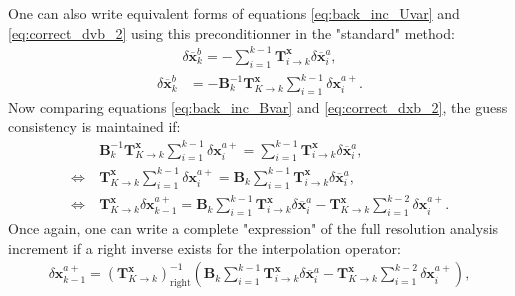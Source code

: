 \documentclass[npg, manuscript]{copernicus}
\begin{document}
One can also write equivalent forms of equations \eqref{eq:back_inc_Uvar} and \eqref{eq:correct_dvb_2} using this preconditionner in the "standard" method:
\begin{align}
\label{eq:back_inc_Bvar}
\delta \overline{\mathbf{x}}^b_k = - \sum_{i=1}^{k-1} \mathbf{T}^\mathbf{x}_{i \rightarrow k} \delta \overline{\mathbf{x}}^a_i,
\end{align}
\begin{align}
\label{eq:correct_dxb_2}
\delta \overline{\mathbf{x}}^b_k & = -\mathbf{B}^{-1}_k \mathbf{T}^\mathbf{x}_{K \rightarrow k} \sum_{i=1}^{k-1} \delta \mathbf{x}^{a+}_i.
\end{align}
Now comparing equations \eqref{eq:back_inc_Bvar} and \eqref{eq:correct_dxb_2}, the guess consistency is maintained if:
\begin{align}
\label{eq:general_condition_B}
& \mathbf{B}^{-1}_k \mathbf{T}^\mathbf{x}_{K \rightarrow k} \sum_{i=1}^{k-1} \delta \mathbf{x}^{a+}_i = \sum_{i=1}^{k-1} \mathbf{T}^\mathbf{x}_{i \rightarrow k} \delta \overline{\mathbf{x}}^a_i, \nonumber \\
\Leftrightarrow \ & \mathbf{T}^\mathbf{x}_{K \rightarrow k} \sum_{i=1}^{k-1} \delta \mathbf{x}^{a+}_i = \mathbf{B}_k \sum_{i=1}^{k-1} \mathbf{T}^\mathbf{x}_{i \rightarrow k} \delta \overline{\mathbf{x}}^a_i, \nonumber \\
 \Leftrightarrow \ & \boxed{\mathbf{T}^\mathbf{x}_{K \rightarrow k} \delta \mathbf{x}^{a+}_{k-1} =  \mathbf{B}_k \sum_{i=1}^{k-1} \mathbf{T}^\mathbf{x}_{i \rightarrow k} \delta \overline{\mathbf{x}}^a_i - \mathbf{T}^\mathbf{x}_{K \rightarrow k} \sum_{i=1}^{k-2} \delta \mathbf{x}^{a+}_i}.
\end{align}
Once again, one can write a complete "expression" of the full resolution analysis increment if a right inverse exists for the interpolation operator:
\begin{align}
\label{eq:general_condition_B_right_inverse}
\delta \mathbf{x}^{a+}_{k-1} =  \left(\mathbf{T}^\mathbf{x}_{K \rightarrow k}\right)^{-1}_\text{right} \left(\mathbf{B}_k \sum_{i=1}^{k-1} \mathbf{T}^\mathbf{x}_{i \rightarrow k} \delta \overline{\mathbf{x}}^a_i - \mathbf{T}^\mathbf{x}_{K \rightarrow k} \sum_{i=1}^{k-2} \delta \mathbf{x}^{a+}_i\right),
\end{align}
\end{document}
